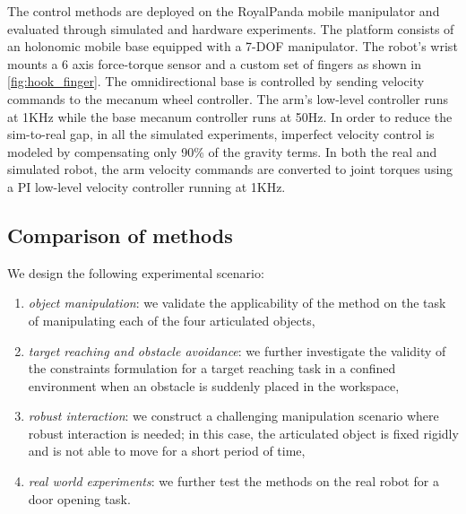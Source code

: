 The control methods are deployed on the RoyalPanda mobile manipulator and evaluated through simulated and hardware experiments. The platform consists of an holonomic mobile base equipped with a 7-DOF manipulator. The robot's wrist mounts a 6 axis force-torque sensor and a custom set of fingers as shown in \fig\ref{fig:hook_finger}.  The omnidirectional base is controlled by sending velocity commands to the mecanum wheel controller. The arm's low-level controller runs at 1KHz while the base mecanum controller runs at 50Hz. In order to reduce the sim-to-real gap, in all the simulated experiments, imperfect velocity control is modeled by compensating only 90\% of the gravity terms. In both the real and simulated robot, the arm velocity commands are converted to joint torques using a PI low-level velocity controller running at 1KHz. 




\subsection{Comparison of methods}
We design the following experimental scenario:
\begin{enumerate}
    \item \textit{object manipulation}: we validate the applicability of the method on the task of manipulating each of the four articulated objects,   
    \item \textit{target reaching and obstacle avoidance}: we further investigate the validity of the constraints formulation for a target reaching task in a confined environment when an obstacle is suddenly placed in the workspace,
    \item \textit{robust interaction}: we construct a challenging manipulation scenario where robust interaction is needed; in this case, the articulated object is fixed rigidly and is not able to move for a short period of time,
    \item \textit{real world experiments}: we further test the methods on the real robot for a door opening task. 
\end{enumerate}

